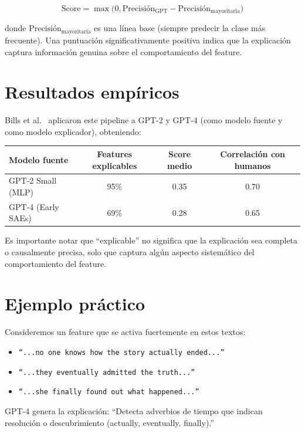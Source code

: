 \documentclass[11pt,a4paper]{report}
\theoremstyle{definition}
\begin{document}
\[
\text{Score} = \max\big(0, \text{Precisión}_{\text{GPT}} - \text{Precisión}_{\text{mayoritaria}}\big)
\]

donde $\text{Precisión}_{\text{mayoritaria}}$ es una línea base (siempre predecir la clase más frecuente). Una puntuación significativamente positiva indica que la explicación captura información genuina sobre el comportamiento del feature.

\section{Resultados empíricos}

Bills et al.~\cite{bills2023automatedexplanation} aplicaron este pipeline a GPT-2 y GPT-4 (como modelo fuente y como modelo explicador), obteniendo:

\begin{center}
\begin{tabular}{lccc}
\toprule
\textbf{Modelo fuente} & \textbf{Features explicables} & \textbf{Score medio} & \textbf{Correlación con humanos} \\
\midrule
GPT-2 Small (MLP) & 95\% & 0.35 & 0.70 \\
GPT-4 (Early SAEs) & 69\% & 0.28 & 0.65 \\
\bottomrule
\end{tabular}
\end{center}

Es importante notar que ``explicable'' no significa que la explicación sea completa o causalmente precisa, solo que captura algún aspecto sistemático del comportamiento del feature.

\section{Ejemplo práctico}

Consideremos un feature que se activa fuertemente en estos textos:

\begin{itemize}
    \item \texttt{``...no one knows how the story actually ended...''}
    \item \texttt{``...they eventually admitted the truth...''}
    \item \texttt{``...she finally found out what happened...''}
\end{itemize}

GPT-4 genera la explicación: ``Detecta adverbios de tiempo que indican resolución o descubrimiento (actually, eventually, finally).''
\end{document}
